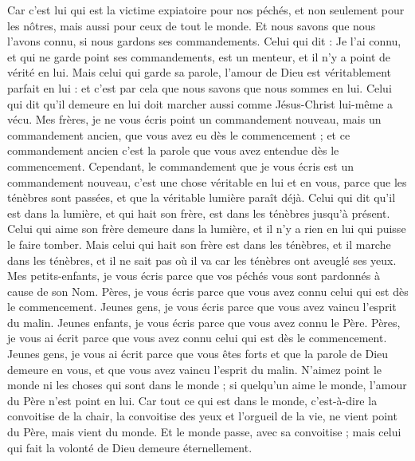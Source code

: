 \begin{multicols}{2}
Car c'est lui qui est la victime expiatoire pour nos péchés, et non seulement pour les nôtres, mais aussi pour ceux de tout le monde.
Et nous savons que nous l'avons connu, si nous gardons ses commandements.
Celui qui dit : Je l'ai connu, et qui ne garde point ses commandements, est un menteur, et il n'y a point de vérité en lui.
Mais celui qui garde sa parole, l'amour de Dieu est véritablement parfait en lui : et c'est par cela que nous savons que nous sommes en lui.
Celui qui dit qu'il demeure en lui doit marcher aussi comme Jésus-Christ lui-même a vécu.
Mes frères, je ne vous écris point un commandement nouveau, mais un commandement ancien, que vous avez eu dès le commencement ; et ce commandement ancien c'est la parole que vous avez entendue dès le commencement.
Cependant, le commandement que je vous écris est un commandement nouveau, c’est une chose véritable en lui et en vous, parce que les ténèbres sont passées, et que la véritable lumière paraît déjà.
Celui qui dit qu'il est dans la lumière, et qui hait son frère, est dans les ténèbres jusqu'à présent.
Celui qui aime son frère demeure dans la lumière, et il n'y a rien en lui qui puisse le faire tomber.
Mais celui qui hait son frère est dans les ténèbres, et il marche dans les ténèbres, et il ne sait pas où il va car les ténèbres ont aveuglé ses yeux.
Mes petits-enfants, je vous écris parce que vos péchés vous sont pardonnés à cause de son Nom.
Pères, je vous écris parce que vous avez connu celui qui est dès le commencement. Jeunes gens, je vous écris parce que vous avez vaincu l’esprit du malin.
Jeunes enfants, je vous écris parce que vous avez connu le Père. Pères, je vous ai écrit parce que vous avez connu celui qui est dès le commencement. Jeunes gens, je vous ai écrit parce que vous êtes forts et que la parole de Dieu demeure en vous, et que vous avez vaincu l’esprit du malin.
N'aimez point le monde ni les choses qui sont dans le monde ; si quelqu'un aime le monde, l'amour du Père n'est point en lui.
Car tout ce qui est dans le monde, c'est-à-dire la convoitise de la chair, la convoitise des yeux et l'orgueil de la vie, ne vient point du Père, mais vient du monde.
Et le monde passe, avec sa convoitise ; mais celui qui fait la volonté de Dieu demeure éternellement.

\end{multicols}
